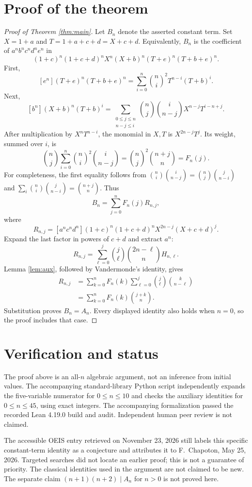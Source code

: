 \documentclass[11pt]{article}
\newcommand{\bn}[2]{\binom{#1}{#2}}
\begin{document}
\section*{Proof of the theorem}
\begin{proof}[Proof of Theorem \ref{thm:main}]
Let $B_n$ denote the asserted constant term. Set
$X=1+a$ and $T=1+a+c+d=X+c+d$.
Equivalently, $B_n$ is the coefficient of $a^nb^nc^nd^ne^n$ in
\[
 (1+c)^n(1+c+d)^n X^n(X+b)^n(T+e)^n(T+b+e)^n.
\]
First,
\[
 [e^n](T+e)^n(T+b+e)^n
 =\sum_{i=0}^{n}\bn ni^2 T^{n-i}(T+b)^i.
\]
Next,
\[
 [b^n](X+b)^n(T+b)^i
 =\sum_{\substack{0\leq j\leq n\\n-j\leq i}}
     \bn nj\bn i{n-j}X^{n-j}T^{i-n+j}.
\]
After multiplication by $X^nT^{n-i}$, the monomial in $X,T$
is $X^{2n-j}T^j$. Its weight, summed over $i$, is
\begin{equation}\label{eq:weight}
 \bn nj\sum_{i=0}^{n}\bn ni^2\bn i{n-j}
 =\bn nj^2\bn{n+j}n=F_n(j).
\end{equation}
For completeness, the first equality follows from
$\bn ni\bn i{n-j}=\bn nj\bn j{n-i}$ and
$\sum_i\bn ni\bn j{n-i}=\bn{n+j}n$.
Thus
\[
 B_n=\sum_{j=0}^{n}F_n(j)R_{n,j},
\]
where
\[
 R_{n,j}=[a^nc^nd^n](1+c)^n(1+c+d)^n
                    X^{2n-j}(X+c+d)^j.
\]
Expand the last factor in powers of $c+d$ and extract $a^n$:
\[
 R_{n,j}=\sum_{\ell=0}^{j}
 \bn j\ell\bn{2n-\ell}n H_{n,\ell}.
\]
Lemma \ref{lem:aux}, followed by Vandermonde's identity, gives
\begin{align*}
 R_{n,j}
 &=\sum_{k=0}^{n}F_n(k)
       \sum_{\ell=0}^{j}\bn j\ell\bn k{n-\ell}\\
 &=\sum_{k=0}^{n}F_n(k)\bn{j+k}n.
\end{align*}
Substitution proves $B_n=A_n$. Every displayed identity also holds
when $n=0$, so the proof includes that case.
\end{proof}

\section*{Verification and status}
The proof above is an all-$n$ algebraic argument, not an inference from
initial values. The accompanying standard-library Python script independently
expands the five-variable numerator for $0\leq n\leq10$ and checks the
auxiliary identities for $0\leq n\leq45$, using exact integers.
The accompanying formalization passed the recorded Lean 4.19.0 build and audit. Independent human peer review is not claimed.

The accessible OEIS entry retrieved on November 23, 2026 still labels this
specific constant-term identity as a conjecture and attributes it to
F.~Chapoton, May 25, 2026. Targeted searches did not locate an earlier proof;
this is not a guarantee of priority. The classical identities used in the
argument are not claimed to be new. The separate claim
$(n+1)(n+2)\mid A_n$ for $n>0$ is not proved here.
\end{document}
